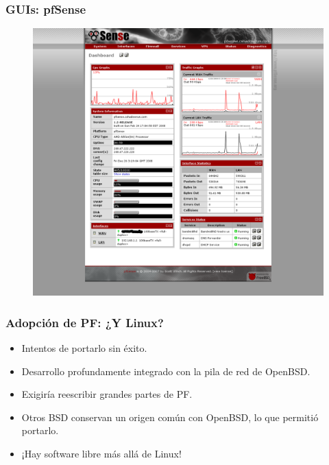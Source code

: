 \documentclass{beamer}
\begin{document}

\begin{frame}
\frametitle{GUIs: pfSense}

\begin{figure}
	\includegraphics[scale=0.20,clip=true]{figs/pfsense-dashboard_0.png} 
\end{figure}

\end{frame}



\begin{frame}
\frametitle{Adopción de PF: ¿Y Linux?}

\begin{itemize}
\item Intentos de portarlo sin éxito.
\item Desarrollo profundamente integrado con la pila de red de OpenBSD.
\item Exigiría reescribir grandes partes de PF.
\item Otros BSD conservan un origen común con OpenBSD, lo que permitió portarlo.
\item ¡Hay software libre más allá de Linux!
\end{itemize}

\end{frame}
\end{document}

